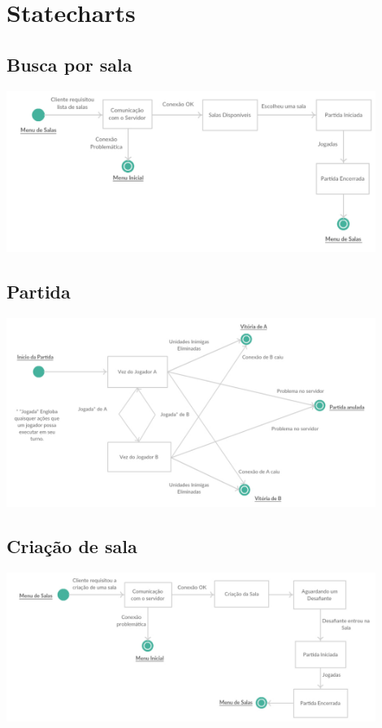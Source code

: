 \section{Statecharts}
\subsection{Busca por sala}
\includegraphics[width=0.9\textwidth]{busca-por-sala-statechart.pdf}
\subsection{Partida}
\includegraphics[width=0.9\textwidth]{partida-statechart.pdf}
\subsection{Criação de sala}
\includegraphics[width=0.9\textwidth]{criacao-de-sala-statechart.pdf}
